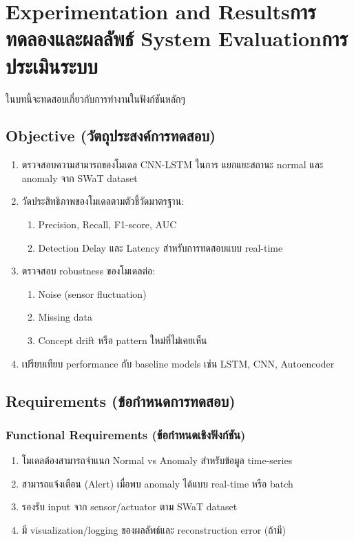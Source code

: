 \chapter{\ifproject%
\ifenglish Experimentation and Results\else การทดลองและผลลัพธ์\fi
\else%
\ifenglish System Evaluation\else การประเมินระบบ\fi
\fi}

ในบทนี้จะทดสอบเกี่ยวกับการทำงานในฟังก์ชันหลักๆ


\section{Objective (วัตถุประสงค์การทดสอบ)}
\begin{enumerate}
    \item ตรวจสอบความสามารถของโมเดล CNN-LSTM ในการ แยกแยะสถานะ normal และ anomaly จาก SWaT dataset
    \item วัดประสิทธิภาพของโมเดลตามตัวชี้วัดมาตรฐาน:
    \begin{enumerate}
        \item Precision, Recall, F1-score, AUC
        \item Detection Delay และ Latency สำหรับการทดสอบแบบ real-time
    \end{enumerate}
    \item ตรวจสอบ robustness ของโมเดลต่อ:
    \begin{enumerate}
        \item Noise (sensor fluctuation)
        \item Missing data
        \item Concept drift หรือ pattern ใหม่ที่ไม่เคยเห็น
    \end{enumerate}
    \item เปรียบเทียบ performance กับ baseline models เช่น LSTM, CNN, Autoencoder
\end{enumerate}

\section{Requirements (ข้อกำหนดการทดสอบ)}
\subsection{Functional Requirements (ข้อกำหนดเชิงฟังก์ชัน)}
\begin{enumerate}
    \item โมเดลต้องสามารถจำแนก Normal vs Anomaly สำหรับข้อมูล time-series
    \item สามารถแจ้งเตือน (Alert) เมื่อพบ anomaly ได้แบบ real-time หรือ batch
    \item รองรับ input จาก sensor/actuator ตาม SWaT dataset
    \item มี visualization/logging ของผลลัพธ์และ reconstruction error (ถ้ามี)
\end{enumerate}

